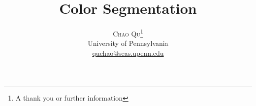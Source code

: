\documentclass[twoside]{article}
\title{\vspace{-15mm}\fontsize{24pt}{10pt}\selectfont\textbf{Color Segmentation}} %
\author{
\large
\textsc{Chao Qu}\thanks{A thank you or further information}\\[2mm] %
\normalsize University of Pennsylvania \\ %
\normalsize \href{mailto:quchao@seas.upenn.edu}{quchao@seas.upenn.edu} %
\vspace{-5mm}
}
\date{}
\begin{document}
\maketitle %

\thispagestyle{fancy} %


\begin{abstract}

\noindent \lipsum[1] %

\end{abstract}


\end{document}
